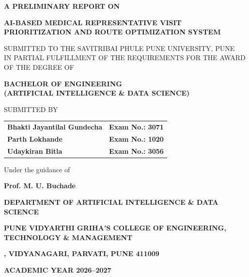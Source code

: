 \documentclass[12pt,a4paper,oneside]{report}
\newcommand{\reporttitle}{AI-BASED MEDICAL REPRESENTATIVE VISIT PRIORITIZATION AND ROUTE OPTIMIZATION SYSTEM}
\newcommand{\guidename}{Prof. M. U. Buchade}
\newcommand{\studentone}{Bhakti Jayantilal Gundecha}
\newcommand{\studenttwo}{Parth Lokhande}
\newcommand{\studentthree}{Udaykiran Bitla}
\newcommand{\exone}{3071}
\newcommand{\extwo}{1020}
\newcommand{\exthree}{3056}
\begin{document}
\begin{titlepage}
\thispagestyle{empty}
\setlength{\parskip}{0pt}
\begin{center}
\vspace*{8mm}
{\bfseries\fontsize{12}{15}\selectfont A PRELIMINARY REPORT ON}\par
\vspace{8mm}
{\bfseries\fontsize{16}{20}\selectfont \reporttitle}\par
\vspace{9mm}
{\fontsize{12}{15}\selectfont SUBMITTED TO THE SAVITRIBAI PHULE PUNE UNIVERSITY, PUNE\\
IN PARTIAL FULFILLMENT OF THE REQUIREMENTS FOR THE AWARD OF THE DEGREE OF}\par
\vspace{5mm}
{\bfseries\fontsize{14}{17}\selectfont BACHELOR OF ENGINEERING\\(ARTIFICIAL INTELLIGENCE \& DATA SCIENCE)}\par
\vspace{8mm}
{\fontsize{12}{15}\selectfont SUBMITTED BY}\par
\vspace{4mm}
\begin{tabular}{>{\raggedright\arraybackslash}p{92mm}r}
\textbf{\studentone} & \textbf{Exam No.: \exone}\\[3pt]
\textbf{\studenttwo} & \textbf{Exam No.: \extwo}\\[3pt]
\textbf{\studentthree} & \textbf{Exam No.: \exthree}\\
\end{tabular}\par
\vspace{8mm}
{\fontsize{12}{15}\selectfont Under the guidance of}\par
\vspace{2mm}
{\bfseries\fontsize{12}{15}\selectfont \guidename}\par
\vfill
{\bfseries\fontsize{14}{17}\selectfont DEPARTMENT OF ARTIFICIAL INTELLIGENCE \& DATA SCIENCE}\par
\vspace{3mm}
{\bfseries\fontsize{12}{15}\selectfont PUNE VIDYARTHI GRIHA'S COLLEGE OF ENGINEERING, TECHNOLOGY \& MANAGEMENT}\par
{\bfseries\fontsize{12}{15}, VIDYANAGARI, PARVATI, PUNE 411009}\par
\vspace{4mm}
{\bfseries\fontsize{12}{15}\selectfont ACADEMIC YEAR 2026--2027}\par
\end{center}
\end{titlepage}
\end{document}
